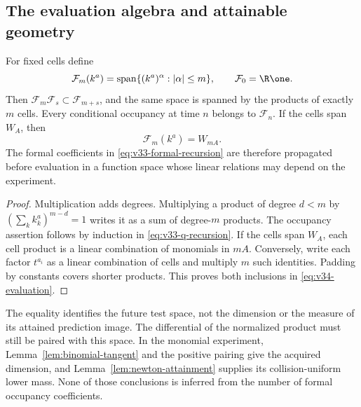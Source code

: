 \subsection{The evaluation algebra and attainable geometry}
\begin{proposition}
\label{prop:v34-evaluation}
For fixed cells define
\[
 \mathcal F_m(k^a)=\operatorname{span}
       \{(k^a)^\alpha:|\alpha|\le m\},\qquad \mathcal F_0=\R\one.
\]
Then $\mathcal F_m\mathcal F_s\subset\mathcal F_{m+s}$, and the
same space is spanned by the products of exactly $m$ cells. Every
conditional occupancy at time $n$ belongs to $\mathcal F_n$.
If the cells span $W_A$, then
\begin{equation}\label{eq:v34-evaluation}
                 \mathcal F_m(k^a)=W_{mA}.
\end{equation}
The formal coefficients in \eqref{eq:v33-formal-recursion} are
therefore propagated before evaluation in a function space whose
linear relations may depend on the experiment.
\end{proposition}
\begin{proof}
Multiplication adds degrees. Multiplying a product of degree $d<m$
by $(\sum_k k_k^a)^{m-d}=1$ writes it as a sum of degree-$m$
products. The occupancy assertion follows by induction in
\eqref{eq:v33-q-recursion}. If the cells span $W_A$, each cell
product is a linear combination of monomials in $mA$. Conversely,
write each factor $t^{a_i}$ as a linear combination of cells and
multiply $m$ such identities. Padding by constants covers shorter
products. This proves both inclusions in \eqref{eq:v34-evaluation}.
\end{proof}

The equality identifies the future test space, not the dimension or
the measure of its attained prediction image. The differential of the
normalized product must still be paired with this space. In the
monomial experiment, Lemma~\ref{lem:binomial-tangent} and the positive
pairing give the acquired dimension, and
Lemma~\ref{lem:newton-attainment} supplies its collision-uniform
lower mass. None of those conclusions is inferred from the number
of formal occupancy coefficients.

